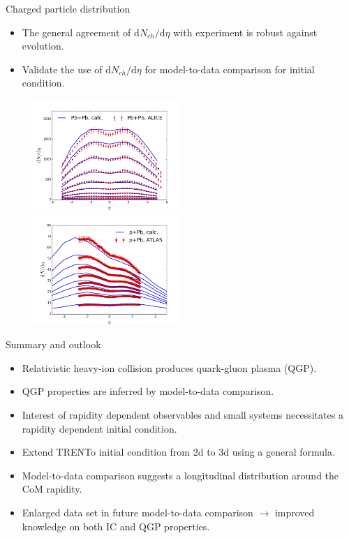 \documentclass[11pt]{beamer}
\begin{document}
\begin{frame}{Charged particle distribution}
\begin{itemize}
\item The general agreement of $\mathrm{d}N_{ch}/\mathrm{d}\eta$ with experiment is robust against evolution.
\item Validate the use of $\mathrm{d}N_{ch}/\mathrm{d}\eta$ for model-to-data comparison for initial condition.
\end{itemize}
\begin{figure}
\begin{center}
\includegraphics[width = 0.5\textwidth]{./pics/final-PbPb-dNdy.png}
\includegraphics[width = 0.5\textwidth]{./pics/final-pPb-dNdy.png}
\end{center}
\end{figure}
\end{frame}

\begin{frame}{Summary and outlook}
\begin{itemize}
\item Relativistic heavy-ion collision produces quark-gluon plasma (QGP).
\item QGP properties are inferred by model-to-data comparison.
\item Interest of rapidity dependent observables and small systems necessitates a rapidity dependent initial condition.
\item Extend TRENTo initial condition from 2d to 3d using a general formula.
\item Model-to-data comparison suggests a longitudinal distribution around the CoM rapidity.
\item Enlarged data set in future model-to-data comparison $\rightarrow$ improved knowledge on both IC and QGP properties.
\end{itemize}
\end{frame}
\end{document}
